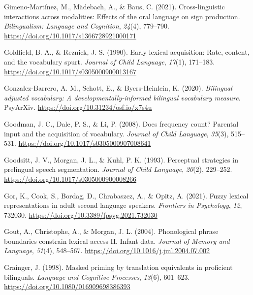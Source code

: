 \documentclass[
  12pt,
  b5paperpaper,
  twoside]{scrreprt}
\newlength{\cslhangindent}
\newlength{\cslentryspacingunit} %
\newenvironment{CSLReferences}[2] %
 {%
  \setlength{\parindent}{0pt}
  \ifodd #1
  \let\oldpar\par
  \def\par{\hangindent=\cslhangindent\oldpar}
  \fi
  \setlength{\parskip}{#2\cslentryspacingunit}
 }%
 {}
\begin{document}
\begin{CSLReferences}{1}{0}
\leavevmode{}%
Gimeno-Martínez, M., Mädebach, A., \& Baus, C. (2021). Cross-linguistic
interactions across modalities: Effects of the oral language on sign
production. \emph{Bilingualism: Language and Cognition}, \emph{24}(4),
779--790. \url{https://doi.org/10.1017/s1366728921000171}

\leavevmode{}%
Goldfield, B. A., \& Reznick, J. S. (1990). Early lexical acquisition:
Rate, content, and the vocabulary spurt. \emph{Journal of Child
Language}, \emph{17}(1), 171--183.
\url{https://doi.org/10.1017/s0305000900013167}

\leavevmode{}%
Gonzalez-Barrero, A. M., Schott, E., \& Byers-Heinlein, K. (2020).
\emph{Bilingual adjusted vocabulary: A developmentally-informed
bilingual vocabulary measure}. {PsyArXiv}.
\url{https://doi.org/10.31234/osf.io/x7s4u}

\leavevmode{}%
Goodman, J. C., Dale, P. S., \& Li, P. (2008). Does frequency count?
{Parental} input and the acquisition of vocabulary. \emph{Journal of
Child Language}, \emph{35}(3), 515--531.
\url{https://doi.org/10.1017/s0305000907008641}

\leavevmode{}%
Goodsitt, J. V., Morgan, J. L., \& Kuhl, P. K. (1993). Perceptual
strategies in prelingual speech segmentation. \emph{Journal of Child
Language}, \emph{20}(2), 229--252.
\url{https://doi.org/10.1017/s0305000900008266}

\leavevmode{}%
Gor, K., Cook, S., Bordag, D., Chrabaszcz, A., \& Opitz, A. (2021).
Fuzzy lexical representations in adult second language speakers.
\emph{Frontiers in Psychology}, \emph{12}, 732030.
\url{https://doi.org/10.3389/fpsyg.2021.732030}

\leavevmode{}%
Gout, A., Christophe, A., \& Morgan, J. L. (2004). Phonological phrase
boundaries constrain lexical access {II}. Infant data. \emph{Journal of
Memory and Language}, \emph{51}(4), 548--567.
\url{https://doi.org/10.1016/j.jml.2004.07.002}

\leavevmode{}%
Grainger, J. (1998). Masked priming by translation equivalents in
proficient bilinguals. \emph{Language and Cognitive Processes},
\emph{13}(6), 601--623. \url{https://doi.org/10.1080/016909698386393}


\end{CSLReferences}
\end{document}
